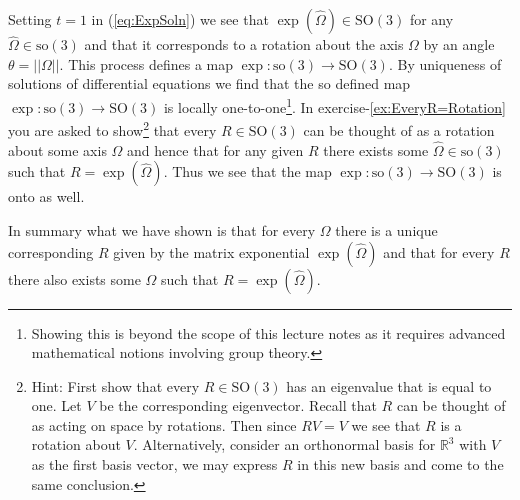 \documentclass[graybox,envcountchap,sectrefs]{svmonoMuga}
\begin{document}
Setting $t=1$ in (\ref{eq:ExpSoln}) we see that $\exp{(\widehat{\Omega})}\in \mathrm{SO}(3)$ for any $\widehat{\Omega}\in \mathrm{so}(3)$ and that it corresponds to a rotation about the axis $\Omega$ by an angle $\theta=||\Omega||$.
This process defines a map $\exp : \mathrm{so}(3) \to \mathrm{SO}(3)$.
By uniqueness of solutions of differential equations we find that the so defined map 
$\exp : \mathrm{so}(3) \to \mathrm{SO}(3)$ is locally one-to-one\footnote{Showing this is beyond the scope of this lecture notes as it requires advanced mathematical notions involving group theory.}. In exercise-\ref{ex:EveryR=Rotation} you are asked to show\footnote{Hint: First show that every $R \in\mathrm{SO}(3)$ has an eigenvalue that is equal to one. Let $V$ be the corresponding eigenvector. Recall that $R$ can be thought of as acting on space by rotations. Then  since $RV=V$ we see that $R$ is a rotation about $V$. Alternatively, consider an orthonormal basis for $\mathbb{R}^3$ with $V$ as the first basis vector, we may express $R$ in this new basis and come to the same conclusion.} that every $R \in \mathrm{SO}(3)$ can be thought of as a rotation about some axis $\Omega$ and hence that for any given $R$ there exists some $\widehat{\Omega}\in \mathrm{so}(3)$ such that $R=\exp{(\widehat{\Omega})}$. Thus we see that the map $\exp : \mathrm{so}(3) \to \mathrm{SO}(3)$ is onto as well.
\begin{svgraybox}
In summary what we have shown is that for every $\Omega$ there is a unique corresponding $R$ given by the matrix exponential $\exp{(\widehat{\Omega})}$ and that for every $R$ there also exists some $\Omega$ such that $R=\exp{(\widehat{\Omega})}$. 
\end{svgraybox}
\end{document}
